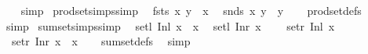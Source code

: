 \begin{isabellebody}
%
\isadelimproof
\ \ %
\endisadelimproof
%
\isatagproof
{}\isamarkupfalse%
\ simp%
\endisatagproof
{\isafoldproof}%
%
\isadelimproof
\isanewline
%
\endisadelimproof
\isanewline
{}\isamarkupfalse%
\ prod{\isacharunderscore}{\kern0pt}set{\isacharunderscore}{\kern0pt}simps{\isacharbrackleft}{\kern0pt}simp{\isacharbrackright}{\kern0pt}{\isacharcolon}{\kern0pt}\isanewline
\ \ {\isachardoublequoteopen}fsts\ {\isacharparenleft}{\kern0pt}x{\isacharcomma}{\kern0pt}\ y{\isacharparenright}{\kern0pt}\ {\isacharequal}{\kern0pt}\ {\isacharbraceleft}{\kern0pt}x{\isacharbraceright}{\kern0pt}{\isachardoublequoteclose}\isanewline
\ \ {\isachardoublequoteopen}snds\ {\isacharparenleft}{\kern0pt}x{\isacharcomma}{\kern0pt}\ y{\isacharparenright}{\kern0pt}\ {\isacharequal}{\kern0pt}\ {\isacharbraceleft}{\kern0pt}y{\isacharbraceright}{\kern0pt}{\isachardoublequoteclose}\isanewline
%
\isadelimproof
\ \ %
\endisadelimproof
%
\isatagproof
{}\isamarkupfalse%
\ prod{\isacharunderscore}{\kern0pt}set{\isacharunderscore}{\kern0pt}defs\ \isamarkupfalse%
\ simp{\isacharplus}{\kern0pt}%
\endisatagproof
{\isafoldproof}%
%
\isadelimproof
\isanewline
%
\endisadelimproof
\isanewline
{}\isamarkupfalse%
\ sum{\isacharunderscore}{\kern0pt}set{\isacharunderscore}{\kern0pt}simps{\isacharbrackleft}{\kern0pt}simp{\isacharbrackright}{\kern0pt}{\isacharcolon}{\kern0pt}\isanewline
\ \ {\isachardoublequoteopen}setl\ {\isacharparenleft}{\kern0pt}Inl\ x{\isacharparenright}{\kern0pt}\ {\isacharequal}{\kern0pt}\ {\isacharbraceleft}{\kern0pt}x{\isacharbraceright}{\kern0pt}{\isachardoublequoteclose}\isanewline
\ \ {\isachardoublequoteopen}setl\ {\isacharparenleft}{\kern0pt}Inr\ x{\isacharparenright}{\kern0pt}\ {\isacharequal}{\kern0pt}\ {\isacharbraceleft}{\kern0pt}{\isacharbraceright}{\kern0pt}{\isachardoublequoteclose}\isanewline
\ \ {\isachardoublequoteopen}setr\ {\isacharparenleft}{\kern0pt}Inl\ x{\isacharparenright}{\kern0pt}\ {\isacharequal}{\kern0pt}\ {\isacharbraceleft}{\kern0pt}{\isacharbraceright}{\kern0pt}{\isachardoublequoteclose}\isanewline
\ \ {\isachardoublequoteopen}setr\ {\isacharparenleft}{\kern0pt}Inr\ x{\isacharparenright}{\kern0pt}\ {\isacharequal}{\kern0pt}\ {\isacharbraceleft}{\kern0pt}x{\isacharbraceright}{\kern0pt}{\isachardoublequoteclose}\isanewline
%
\isadelimproof
\ \ %
\endisadelimproof
%
\isatagproof
{}\isamarkupfalse%
\ sum{\isacharunderscore}{\kern0pt}set{\isacharunderscore}{\kern0pt}defs\ \isamarkupfalse%
\ simp{\isacharplus}{\kern0pt}%
\endisatagproof
{\isafoldproof}%

\end{isabellebody}
